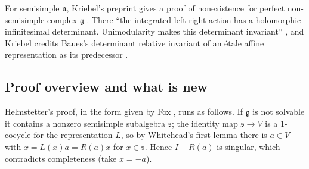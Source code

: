 \documentclass[11pt]{article}
\theoremstyle{definition}
\theoremstyle{remark}
\newcommand{\g}{\mathfrak{g}}
\newcommand{\n}{\mathfrak{n}}
\newcommand{\s}{\mathfrak{s}}
\begin{document}
For semisimple $\n$, Kriebel's preprint gives a proof of nonexistence for
perfect non-semisimple complex $\g$ \cite[Theorem 1 and Corollary 3]{Kr}.
There ``the integrated left-right action has a holomorphic infinitesimal
determinant. Unimodularity makes this determinant invariant''
\cite[abstract]{Kr}, and Kriebel credits Baues's determinant relative
invariant of an \'etale affine representation as its predecessor
\cite[Theorem 5.19 and Corollary 5.20]{Ba}.

\subsection{Proof overview and what is new}
Helmstetter's proof, in the form given by Fox \cite[proof of Lemma
5.3]{Fo}, runs as follows. If $\g$ is not solvable it contains a nonzero
semisimple subalgebra $\s$; the identity map $\s\to V$ is a $1$-cocycle for
the representation $L$, so by Whitehead's first lemma there is $a\in V$
with $x=L(x)a=R(a)x$ for $x\in\s$. Hence $I-R(a)$ is singular, which
contradicts completeness (take $x=-a$).
\end{document}
